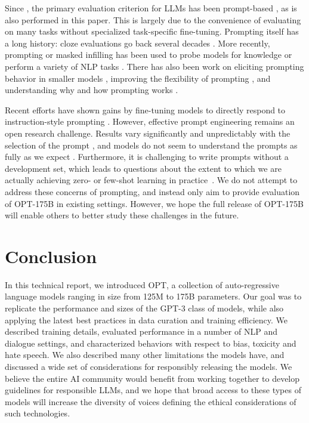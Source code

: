 \documentclass[11pt]{article}
\newcommand{\OPT}[0]{{OPT-175B}}
\begin{document}
Since \citet{brown2020gpt3}, the primary evaluation criterion for LLMs has been prompt-based \cite{eleutherai2022,gopher2022,palm2022}, as is also performed in this paper. This is largely due to the convenience of evaluating on many tasks without specialized task-specific fine-tuning. Prompting itself has a long history: cloze evaluations go back several decades \cite{chambers-jurafsky-2008-unsupervised,storycloze}. More recently, prompting or masked infilling has been used to probe models for knowledge \cite{petroni2019language} or perform a variety of NLP tasks \cite{radford2019language, brown2020gpt3}.
There has also been work on eliciting prompting behavior in smaller models \cite{timopriming2020,gao2021,Li2021Prefix-Tuning:Generation,DBLP:journals/corr/abs-2104-08691,Scao2021HowWorth}, improving the flexibility of prompting \cite{Shin2020AutoPrompt}, and understanding why and how prompting works \cite{incontextgpt3_2021,min2022rethinking}. 

Recent efforts have shown gains by fine-tuning models to directly respond to instruction-style prompting \cite{flan2021,min2021metaicl,sanh2021multitask,ouyang2022training}. However, effective prompt engineering remains an open research challenge. Results vary significantly and unpredictably with the selection of the prompt  \cite{promptsensitivity2021}, and models do not seem to understand the prompts as fully as we expect \cite{webson2021prompt}. Furthermore, it is challenging to write prompts without a development set, which leads to questions about the extent to which we are actually achieving zero- or few-shot learning in practice~\cite{perez2021true}. We do not attempt to address these concerns of prompting, and instead only aim to provide evaluation of \OPT{} in existing settings. However, we hope the full release of \OPT{} will enable others to better study these challenges in the future. 
\section{Conclusion}
\label{sec:conclusion}

In this technical report, we introduced OPT, a collection of auto-regressive language models ranging in size from 125M to 175B parameters. 
Our goal was to replicate the performance and sizes of the GPT-3 class of models, while also applying the latest best practices in data curation and training efficiency.
We described training details, evaluated performance in a number of NLP and dialogue settings, and characterized behaviors with respect to bias, toxicity and hate speech. We also described many other limitations the models have, and discussed a wide set of considerations for responsibly releasing the models. We believe the entire AI community would benefit from working together to develop guidelines for responsible LLMs, and we hope that broad access to these types of models will increase the diversity of voices defining the ethical considerations of such technologies.
\end{document}
